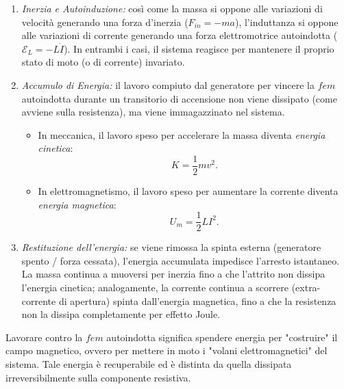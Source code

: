 \documentclass[a4paper,11pt]{report}
\begin{document}
\begin{enumerate}
    \item \textit{Inerzia e Autoinduzione:}
    così come la massa si oppone alle variazioni di velocità generando una forza d'inerzia ($F_{in} = -ma$), l'induttanza si oppone alle variazioni di corrente generando una forza elettromotrice autoindotta ($\mathcal{E}_L = -L \dot{I}$). In entrambi i casi, il sistema reagisce per mantenere il proprio stato di moto (o di corrente) invariato.

    \item \textit{Accumulo di Energia:}
    il lavoro compiuto dal generatore per vincere la $fem$ autoindotta durante un transitorio di accensione non viene dissipato (come avviene sulla resistenza), ma viene immagazzinato nel sistema.
    \begin{itemize}
        \item In meccanica, il lavoro speso per accelerare la massa diventa \textit{energia cinetica}:
        \[ K = \frac{1}{2} m v^2. \]
        \item In elettromagnetismo, il lavoro speso per aumentare la corrente diventa \textit{energia magnetica}:
        \[ U_m = \frac{1}{2} L I^2. \]
    \end{itemize}
    
    \item \textit{Restituzione dell'energia:}
    se viene rimossa la spinta esterna (generatore spento / forza cessata), l'energia accumulata impedisce l'arresto istantaneo. La massa continua a muoversi per inerzia fino a che l'attrito non dissipa l'energia cinetica; analogamente, la corrente continua a scorrere (extra-corrente di apertura) spinta dall'energia magnetica, fino a che la resistenza non la dissipa completamente per effetto Joule.
\end{enumerate}
    Lavorare contro la $fem$ autoindotta significa spendere energia per "costruire" il campo magnetico, ovvero per mettere in moto i "volani elettromagnetici" del sistema. Tale energia è recuperabile ed è distinta da quella dissipata irreversibilmente sulla componente resistiva.
\end{document}
